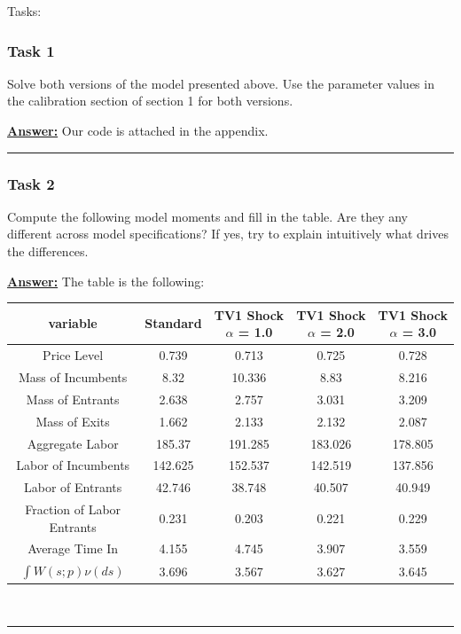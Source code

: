 \documentclass{article} %
\theoremstyle{definition}
\newenvironment{solution}[1][Answer]{\begin{singlespace}\underline{\textbf{#1:}}\quad }{\ \rule{0.3em}{0.3em}\end{singlespace}} %
\begin{document}
Tasks:
\subsubsection*{Task 1}
Solve both versions of the model presented above. Use the parameter values in the calibration section of section 1 for both versions.
\begin{solution}
Our code is attached in the appendix.
\end{solution}
\subsubsection*{Task 2}
Compute the following model moments and fill in the table. Are they any different across model specifications? If yes, try to explain intuitively what drives the differences.
\begin{solution}
	The table is the following:
	\begin{center}
	\begin{tabular}{ccccc}
		variable & Standard & TV1 Shock $\alpha$ = 1.0 & TV1 Shock $\alpha$ = 2.0 & TV1 Shock $\alpha$ = 3.0\\
		\hline
		Price Level & 0.739 & 0.713 & 0.725 & 0.728\\
		Mass of Incumbents & 8.32 & 10.336 & 8.83 & 8.216\\
		Mass of Entrants & 2.638 & 2.757 & 3.031 & 3.209\\
		Mass of Exits & 1.662 & 2.133 & 2.132 & 2.087\\
		Aggregate Labor & 185.37 & 191.285 & 183.026 & 178.805\\
		Labor of Incumbents & 142.625 & 152.537 & 142.519 & 137.856\\
		Labor of Entrants & 42.746 & 38.748 & 40.507 & 40.949\\
		Fraction of Labor Entrants & 0.231 & 0.203 & 0.221 & 0.229\\
		\hline
		Average Time In & 4.155 & 4.745 & 3.907 & 3.559\\
		$\int W(s;p)\nu(ds)$ & 3.696 & 3.567 & 3.627 & 3.645\\

	\end{tabular}
	\end{center}


\end{solution}
\end{document}
